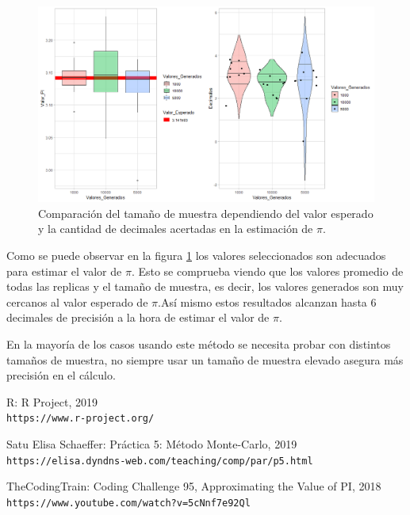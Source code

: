 \documentclass{article}
\begin{document}


\begin{figure}[H]
\centering
\includegraphics[width=180mm]{Reto1.png}
\caption{Comparación del tamaño de muestra dependiendo del valor esperado y la cantidad de decimales acertadas en la estimación de $\pi$.}
\label{reto}
\end{figure}

Como se puede observar en la figura \ref{reto} los valores seleccionados son adecuados para estimar el valor de $\pi$.
Esto se comprueba viendo que los valores promedio de todas las replicas y el tamaño de muestra, es decir, los valores generados son muy cercanos al valor esperado de $\pi$.Así mismo estos resultados alcanzan hasta 6 decimales de precisión a la hora de estimar el valor de $\pi$.

En la mayoría de los casos usando este método se necesita probar con distintos tamaños de muestra, no siempre usar un tamaño de muestra elevado asegura más precisión en el cálculo.

\begin{thebibliography}{9}

R:  R Project, 2019
\\\texttt{https://www.r-project.org/}

Satu Elisa Schaeffer: Práctica 5: Método Monte-Carlo, 2019
\\\texttt{https://elisa.dyndns-web.com/teaching/comp/par/p5.html}

TheCodingTrain: Coding Challenge 95, Approximating the Value of PI, 2018
\\\texttt{https://www.youtube.com/watch?v=5cNnf7e92Ql}

\end{thebibliography}
\end{document}
